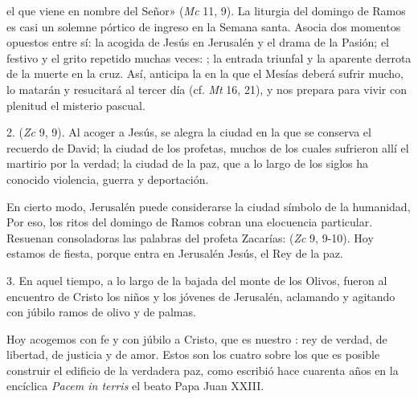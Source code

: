 \begin{body}
 el que viene en nombre del Señor» (\textit{Mc} 11, 9). La liturgia del domingo de Ramos es casi un solemne pórtico de ingreso en la Semana santa. Asocia dos momentos opuestos entre sí: la acogida de Jesús en Jerusalén y el drama de la Pasión; el  festivo y el grito repetido muchas veces: ; la entrada triunfal y la aparente derrota de la muerte en la cruz. Así, anticipa la  en la que el Mesías deberá sufrir mucho, lo matarán y resucitará al tercer día (cf. \textit{Mt} 16, 21), y nos prepara para vivir con plenitud el misterio pascual.

2.  (\textit{Zc} 9, 9). Al acoger a Jesús, se alegra la ciudad en la que se conserva el recuerdo de David; la ciudad de los profetas, muchos de los cuales sufrieron allí el martirio por la verdad; la ciudad de la paz, que a lo largo de los siglos ha conocido violencia, guerra y deportación.

En cierto modo, Jerusalén puede considerarse la ciudad símbolo de la humanidad,  Por eso, los ritos del domingo de Ramos cobran una elocuencia particular. Resuenan consoladoras las palabras del profeta Zacarías:  (\textit{Zc} 9, 9-10). Hoy estamos de fiesta, porque entra en Jerusalén Jesús, el Rey de la paz.

3. En aquel tiempo, a lo largo de la bajada del monte de los Olivos, fueron al encuentro de Cristo los niños y los jóvenes de Jerusalén, aclamando y agitando con júbilo ramos de olivo y de palmas. 


Hoy acogemos con fe y con júbilo a Cristo, que es nuestro : rey de verdad, de libertad, de justicia y de amor. Estos son los cuatro  sobre los que es posible construir el edificio de la verdadera paz, como escribió hace cuarenta años en la encíclica \textit{Pacem in terris} el beato Papa Juan XXIII. 


\end{body}

